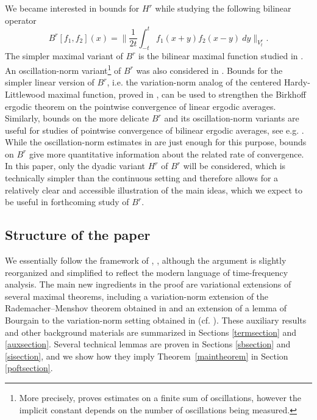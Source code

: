 \documentclass[12pt]{amsart}
\numberwithin{equation}{section}
\begin{document}
We became interested in bounds for $H^r$ while studying the following bilinear operator
\begin{equation}\label{e.variationBHT}
B^r[f_1,f_2](x) = \|\frac{1}{2t}\int_{-t}^tf_1(x + y)f_2(x-y)\ dy \|_{V^r_t}.
\end{equation}
The simpler maximal variant of $B^r$ is the bilinear maximal function studied in \cite{lacey00bmf}. An oscillation-norm variant\footnote{More precisely, \cite{demeter07pce} proves  estimates on a finite sum of oscillations, however the implicit constant depends on the number of oscillations being measured.} of $B^r$ was also considered in \cite{demeter07pce}. Bounds for the simpler linear version of $B^r$, i.e. the variation-norm analog of the centered Hardy-Littlewood maximal function, proved in \cite{bourgain89pes}, can be used to strengthen the Birkhoff ergodic theorem on the pointwise convergence of linear ergodic averages. Similarly, bounds on the more delicate $B^r$ and its oscillation-norm variants are useful for studies of pointwise convergence of bilinear ergodic averages, see e.g. \cite{demeter07pce}. While the oscillation-norm estimates in \cite{demeter07pce} are just enough for this purpose, bounds on $B^r$ give more quantitative information about the related rate of convergence.  In this paper, only the dyadic variant $H^r$ of $B^r$ will be considered, which is technically simpler than the continuous setting and therefore allows for a relatively clear and accessible illustration of the main ideas, which we expect to be useful in forthcoming study of $B^r$.   

\subsection{Structure of the paper} We essentially follow the framework of \cite{lacey00bmf}, \cite{thiele01mqo}, although the argument is slightly reorganized and simplified to reflect the modern language of time-frequency analysis. The main new ingredients in the proof are variational extensions of several maximal theorems, including a variation-norm extension of the Rademacher--Menshov theorem obtained in \cite{lewko12esv} and an extension of a lemma of Bourgain \cite{bourgain89pes} to the variation-norm setting obtained in \cite{nazarov10czd} (cf. \cite{oberlin11awm}). These auxiliary results and other background materials are summarized in Sections \ref{termsection} and \ref{auxsection}. Several technical lemmas are proven in Sections \ref{sbsection} and \ref{sisection}, and we show how they imply Theorem~\ref{maintheorem} in Section \ref{poftsection}. 
\end{document}
